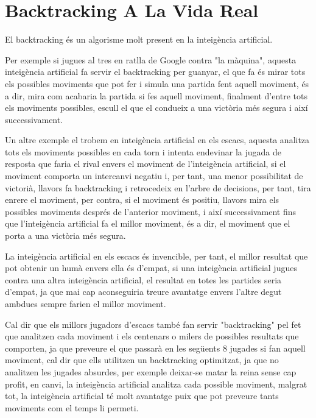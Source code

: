 \section{Backtracking A La Vida Real}

El backtracking és un algorisme molt present en la inte\lgem igència artificial.

Per exemple si jugues al tres en ratlla de Google contra "la màquina", aquesta inte\lgem igència artificial fa servir el backtracking per guanyar, el que fa és mirar tots els possibles moviments que pot fer i simula una partida fent aquell moviment, és a dir, mira com acabaria la partida si fes aquell moviment, finalment d'entre tots els moviments possibles, escull el que el condueix a una victòria més segura i així successivament. \newline

Un altre exemple el trobem en inte\lgem igència artificial en els escacs, aquesta analitza tots els moviments possibles en cada torn i intenta endevinar la jugada de resposta que faria el rival envers el moviment de l'inte\lgem igència artificial, si el moviment comporta un intercanvi negatiu i, per tant, una menor possibilitat de victorià, llavors fa backtracking i retrocedeix en l'arbre de decisions, per tant, tira enrere el moviment, per contra, si el moviment és positiu, llavors mira els possibles moviments després de l'anterior moviment, i així successivament fins que l'inte\lgem igència artificial fa el millor moviment, és a dir, el moviment que el porta a una victòria més segura. \newline

La inte\lgem igència artificial en els escacs és invencible, per tant, el millor resultat que pot obtenir un humà envers ella és d'empat, si una inte\lgem igència artificial jugues contra una altra inte\lgem igència artificial, el resultat en totes les partides seria d'empat, ja que mai cap aconseguiria treure avantatge envers l'altre degut ambdues sempre farien el millor moviment. \newline

Cal dir que els millors jugadors d'escacs també fan servir "backtracking" pel fet que analitzen cada moviment i els centenars o milers de possibles resultats que comporten, ja que preveure el que passarà en les següents 8 jugades si fan aquell moviment, cal dir que ells utilitzen un backtracking optimitzat, ja que no analitzen les jugades absurdes, per exemple deixar-se matar la reina sense cap profit, en canvi, la inte\lgem igència artificial analitza cada possible moviment, malgrat tot, la inte\lgem igència artificial té molt avantatge puix que pot preveure tants moviments com el temps li permeti.


